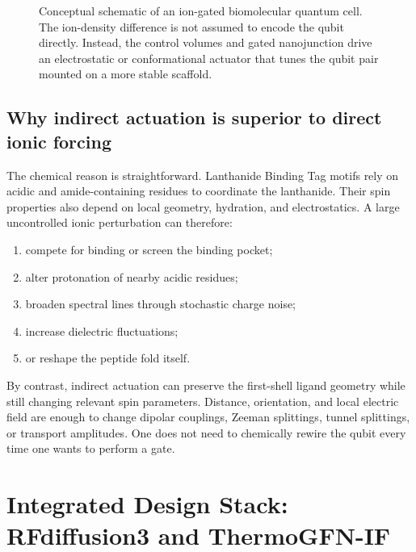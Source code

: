 \documentclass[11pt]{report}
\newcommand{\lbt}{Lanthanide Binding Tag}
\theoremstyle{definition}
\begin{document}
\begin{figure}[ht]
\caption{Conceptual schematic of an ion-gated biomolecular quantum cell. The ion-density difference is not assumed to encode the qubit directly. Instead, the control volumes and gated nanojunction drive an electrostatic or conformational actuator that tunes the qubit pair mounted on a more stable scaffold.}
\end{figure}

\section{Why indirect actuation is superior to direct ionic forcing}
The chemical reason is straightforward. \lbt{} motifs rely on acidic and amide-containing residues to coordinate the lanthanide. Their spin properties also depend on local geometry, hydration, and electrostatics. A large uncontrolled ionic perturbation can therefore:

\begin{enumerate}[leftmargin=2em]
\item compete for binding or screen the binding pocket;
\item alter protonation of nearby acidic residues;
\item broaden spectral lines through stochastic charge noise;
\item increase dielectric fluctuations;
\item or reshape the peptide fold itself.
\end{enumerate}

By contrast, indirect actuation can preserve the first-shell ligand geometry while still changing relevant spin parameters. Distance, orientation, and local electric field are enough to change dipolar couplings, Zeeman splittings, tunnel splittings, or transport amplitudes. One does not need to chemically rewire the qubit every time one wants to perform a gate.

\chapter{Integrated Design Stack: RFdiffusion3 and ThermoGFN-IF}
\end{document}
